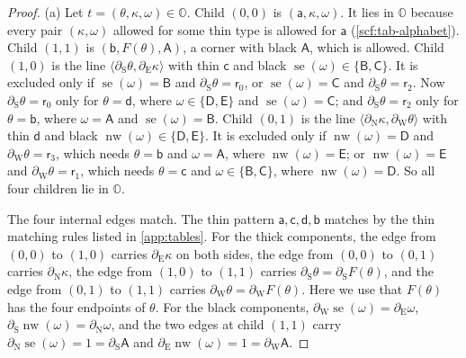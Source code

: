\begin{proof}
(a) Let $t=(\theta,\kappa,\omega)\in\mathbb O$. Child $(0,0)$ is $(\mathsf a,\kappa,\omega)$. It lies in $\mathbb O$ because every pair $(\kappa,\omega)$ allowed for some thin type is allowed for $\mathsf a$ (\cref{scf:tab-alphabet}). Child $(1,1)$ is $(\mathsf b,F(\theta),\mathsf A)$, a corner with black $\mathsf A$, which is allowed. Child $(1,0)$ is the line $\langle\partial_{\mathrm S}\theta,\partial_{\mathrm E}\kappa\rangle$ with thin $\mathsf c$ and black $\operatorname{se}(\omega)\in\{\mathsf B,\mathsf C\}$. It is excluded only if $\operatorname{se}(\omega)=\mathsf B$ and $\partial_{\mathrm S}\theta=\mathsf r_0$, or $\operatorname{se}(\omega)=\mathsf C$ and $\partial_{\mathrm S}\theta=\mathsf r_2$. Now $\partial_{\mathrm S}\theta=\mathsf r_0$ only for $\theta=\mathsf d$, where $\omega\in\{\mathsf D,\mathsf E\}$ and $\operatorname{se}(\omega)=\mathsf C$; and $\partial_{\mathrm S}\theta=\mathsf r_2$ only for $\theta=\mathsf b$, where $\omega=\mathsf A$ and $\operatorname{se}(\omega)=\mathsf B$. Child $(0,1)$ is the line $\langle\partial_{\mathrm N}\kappa,\partial_{\mathrm W}\theta\rangle$ with thin $\mathsf d$ and black $\operatorname{nw}(\omega)\in\{\mathsf D,\mathsf E\}$. It is excluded only if $\operatorname{nw}(\omega)=\mathsf D$ and $\partial_{\mathrm W}\theta=\mathsf r_3$, which needs $\theta=\mathsf b$ and $\omega=\mathsf A$, where $\operatorname{nw}(\omega)=\mathsf E$; or $\operatorname{nw}(\omega)=\mathsf E$ and $\partial_{\mathrm W}\theta=\mathsf r_1$, which needs $\theta=\mathsf c$ and $\omega\in\{\mathsf B,\mathsf C\}$, where $\operatorname{nw}(\omega)=\mathsf D$. So all four children lie in $\mathbb O$.

The four internal edges match. The thin pattern $\mathsf a,\mathsf c,\mathsf d,\mathsf b$ matches by the thin matching rules listed in \cref{app:tables}. For the thick components, the edge from $(0,0)$ to $(1,0)$ carries $\partial_{\mathrm E}\kappa$ on both sides, the edge from $(0,0)$ to $(0,1)$ carries $\partial_{\mathrm N}\kappa$, the edge from $(1,0)$ to $(1,1)$ carries $\partial_{\mathrm S}\theta=\partial_{\mathrm S}F(\theta)$, and the edge from $(0,1)$ to $(1,1)$ carries $\partial_{\mathrm W}\theta=\partial_{\mathrm W}F(\theta)$. Here we use that $F(\theta)$ has the four endpoints of $\theta$. For the black components, $\partial_{\mathrm W}\operatorname{se}(\omega)=\partial_{\mathrm E}\omega$, $\partial_{\mathrm S}\operatorname{nw}(\omega)=\partial_{\mathrm N}\omega$, and the two edges at child $(1,1)$ carry $\partial_{\mathrm N}\operatorname{se}(\omega)=1=\partial_{\mathrm S}\mathsf A$ and $\partial_{\mathrm E}\operatorname{nw}(\omega)=1=\partial_{\mathrm W}\mathsf A$.


\end{proof}
